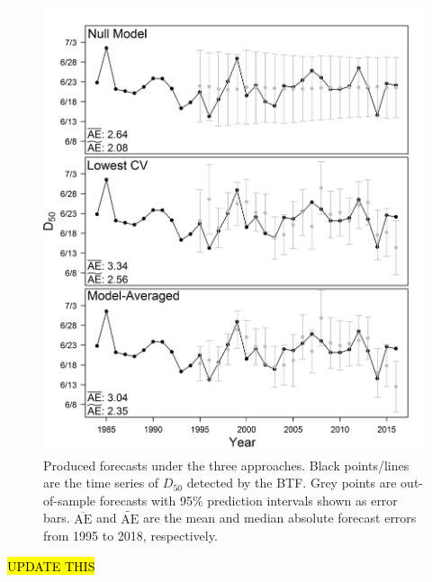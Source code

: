 \documentclass[12pt,]{book}
\theoremstyle{definition}
\theoremstyle{definition}
\theoremstyle{definition}
\theoremstyle{remark}
\begin{document}
\begin{figure}
  \centering
  \includegraphics{img/Ch2/forecasts.png}
  \caption{Produced forecasts under the three approaches. Black points/lines are the time series of $D_{50}$ detected by the BTF. Grey points are out-of-sample forecasts with 95$\%$ prediction intervals shown as error bars. $\overline{\text{AE}}$ and $\widetilde{\text{AE}}$ are the mean and median absolute forecast errors from 1995 to 2018, respectively.}
  \label{fig:forecasts}
\end{figure}

\clearpage

\hl{UPDATE THIS}
\end{document}
